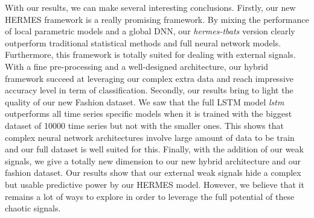 \documentclass{article} %
\begin{document}
With our results, we can make several interesting conclusions. Firstly, our new HERMES framework is a really promising framework. By mixing the performance of local parametric models and a global DNN, our \textit{hermes-tbats} version clearly outperform traditional statistical methods and full neural network models. Furthermore, this framework is totally suited for dealing with external signals. With a fine pre-processing and a well-designed architecture, our hybrid framework succeed at leveraging our complex extra data and reach impressive accuracy level in term of classification. Secondly, our results bring to light the quality of our new Fashion dataset. We saw that the full LSTM model \textit{lstm} outperforms all time series specific models when it is trained with the biggest dataset of 10000 time series but not with the smaller ones. This shows that complex neural network architectures involve large amount of data to be train and our full dataset is well suited for this. Finally, with the addition of our weak signals, we give a totally new dimension to our new hybrid architecture and our fashion dataset. Our results show that our external weak signals hide a complex but usable predictive power by our HERMES model. However, we believe that it remains a lot of ways to explore in order to leverage the full potential of these chaotic signals.

\end{document}
